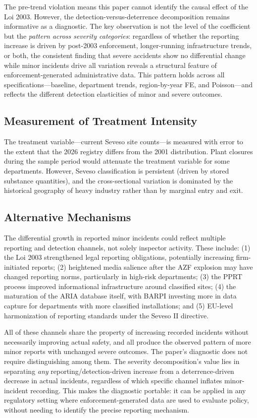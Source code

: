 \documentclass[12pt]{article}
\begin{document}
The pre-trend violation means this paper cannot identify the causal effect of the Loi 2003. However, the detection-versus-deterrence decomposition remains informative as a diagnostic. The key observation is not the level of the coefficient but the \textit{pattern across severity categories}: regardless of whether the reporting increase is driven by post-2003 enforcement, longer-running infrastructure trends, or both, the consistent finding that severe accidents show no differential change while minor incidents drive all variation reveals a structural feature of enforcement-generated administrative data. This pattern holds across all specifications---baseline, department trends, region-by-year FE, and Poisson---and reflects the different detection elasticities of minor and severe outcomes.

\subsection{Measurement of Treatment Intensity}

The treatment variable---current Seveso site counts---is measured with error to the extent that the 2026 registry differs from the 2001 distribution. Plant closures during the sample period would attenuate the treatment variable for some departments. However, Seveso classification is persistent (driven by stored substance quantities), and the cross-sectional variation is dominated by the historical geography of heavy industry rather than by marginal entry and exit.

\subsection{Alternative Mechanisms}

The differential growth in reported minor incidents could reflect multiple reporting and detection channels, not solely inspector activity. These include: (1) the Loi 2003 strengthened legal reporting obligations, potentially increasing firm-initiated reports; (2) heightened media salience after the AZF explosion may have changed reporting norms, particularly in high-risk departments; (3) the PPRT process improved informational infrastructure around classified sites; (4) the maturation of the ARIA database itself, with BARPI investing more in data capture for departments with more classified installations; and (5) EU-level harmonization of reporting standards under the Seveso II directive.

All of these channels share the property of increasing recorded incidents without necessarily improving actual safety, and all produce the observed pattern of more minor reports with unchanged severe outcomes. The paper's diagnostic does not require distinguishing among them. The severity decomposition's value lies in separating \textit{any} reporting/detection-driven increase from a deterrence-driven decrease in actual incidents, regardless of which specific channel inflates minor-incident recording. This makes the diagnostic portable: it can be applied in any regulatory setting where enforcement-generated data are used to evaluate policy, without needing to identify the precise reporting mechanism.
\end{document}
